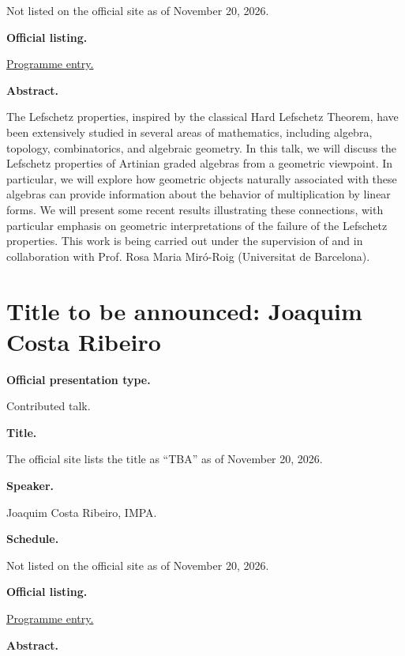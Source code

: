 Not listed on the official site as of
November 20, 2026.

\medskip\noindent
{\bf Official listing.}

\href{%
https://sites.google.com/view/%
geoalgcompluff/legal/%
legal-2027-resumos#h.dant8g3oe5ea%
}{Programme entry.}

\medskip\noindent
{\bf Abstract.}

The Lefschetz properties, inspired by the
classical Hard Lefschetz Theorem, have been
extensively studied in several areas of
mathematics, including algebra, topology,
combinatorics, and algebraic geometry. In
this talk, we will discuss the Lefschetz
properties of Artinian graded algebras from a
geometric viewpoint. In particular, we will
explore how geometric objects naturally
associated with these algebras can provide
information about the behavior of
multiplication by linear forms. We will
present some recent results illustrating
these connections, with particular emphasis
on geometric interpretations of the failure
of the Lefschetz properties. This work is
being carried out under the supervision of
and in collaboration with Prof. Rosa Maria
Miró-Roig (Universitat de Barcelona).

\section{Title to be announced: Joaquim Costa
Ribeiro}
\label{section-tba-ribeiro}

\medskip\noindent
{\bf Official presentation type.}

Contributed talk.

\medskip\noindent
{\bf Title.}

The official site lists the title as
``TBA'' as of November 20, 2026.

\medskip\noindent
{\bf Speaker.}

Joaquim Costa Ribeiro, IMPA.

\medskip\noindent
{\bf Schedule.}

Not listed on the official site as of
November 20, 2026.

\medskip\noindent
{\bf Official listing.}

\href{%
https://sites.google.com/view/%
geoalgcompluff/legal/%
legal-2027-resumos#h.dant8g3oe5ea%
}{Programme entry.}

\medskip\noindent
{\bf Abstract.}

